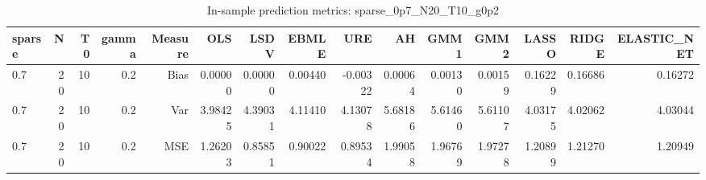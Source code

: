 \begin{table}[!htbp]\centering
\caption{In-sample prediction metrics: sparse_0p7_N20_T10_g0p2}
\label{tab:table2_sparse_0p7_N20_T10_g0p2}
\begin{tabular}{lrrrrrrrrrrrrrr}
\hline
sparse & N & T0 & gamma & Measure & OLS & LSDV & EBMLE & URE & AH & GMM1 & GMM2 & LASSO & RIDGE & ELASTIC_NET \\
\hline
0.7 & 20 & 10 & 0.2 & Bias & 0.00000 & 0.00000 & 0.00440 & -0.00322 & 0.00064 & 0.00130 & 0.00159 & 0.16229 & 0.16686 & 0.16272 \\
0.7 & 20 & 10 & 0.2 & Var & 3.98425 & 4.39031 & 4.11410 & 4.13078 & 5.68186 & 5.61460 & 5.61107 & 4.03175 & 4.02062 & 4.03044 \\
0.7 & 20 & 10 & 0.2 & MSE & 1.26203 & 0.85851 & 0.90022 & 0.89534 & 1.99058 & 1.96769 & 1.97278 & 1.20899 & 1.21270 & 1.20949 \\
\hline
\end{tabular}
\end{table}


